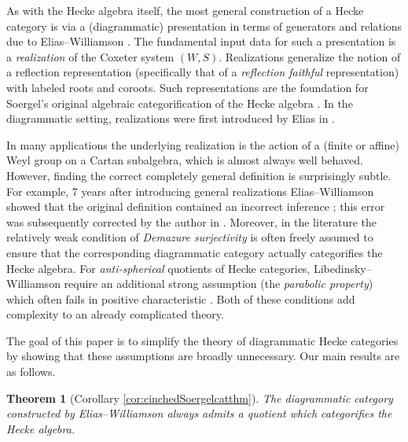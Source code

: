 \documentclass{amsart}
\theoremstyle{plain}
\newtheorem{thmletter}{Theorem}[section]
\theoremstyle{definition}
\theoremstyle{remark}
\numberwithin{equation}{section}
\newcommand{\defnemph}[1]{\emph{#1}}
\begin{document}
As with the Hecke algebra itself, the most general construction of a Hecke category is via a (diagrammatic) presentation in terms of generators and relations due to Elias--Williamson \cite{EW-SoergelCalc}. 
The fundamental input data for such a presentation is a \defnemph{realization} of the Coxeter system $(W,S)$. 
Realizations generalize the notion of a reflection representation (specifically that of a \defnemph{reflection faithful} representation) with labeled roots and coroots. 
Such representations are the foundation for Soergel's original algebraic categorification of the Hecke algebra \cite{soergel-unzerlegbareBimoduln}.
In the diagrammatic setting, realizations were first introduced by Elias in \cite{dihedralcathedral}. 

In many applications the underlying realization is the action of a (finite or affine) Weyl group on a Cartan subalgebra, which is almost always well behaved. %
However, finding the correct completely general definition is surprisingly subtle. 
For example, 7 years after introducing general realizations Elias--Williamson showed that the original definition contained an incorrect inference \cite{ew-loccalc}; this error was subsequently corrected by the author in \cite{2colJW}. 
Moreover, in the literature the relatively weak condition of \defnemph{Demazure surjectivity} is often freely assumed to ensure that the corresponding diagrammatic category actually categorifies the Hecke algebra. 
For \defnemph{anti-spherical} quotients of Hecke categories, Libedinsky--Williamson require an additional strong assumption (the \defnemph{parabolic property}) which often fails in positive characteristic \cite{LW-antispher}. 
Both of these conditions add complexity to an already complicated theory.

The goal of this paper is to simplify the theory of diagrammatic Hecke categories by showing that these assumptions are broadly unnecessary. 
Our main results are as follows.

\begin{thmletter}[{Corollary \ref{cor:cinchedSoergelcatthm}}] \label{thm:intro1}
The diagrammatic category constructed by Elias--Williamson always admits a quotient which categorifies the Hecke algebra.
\end{thmletter}
\end{document}
